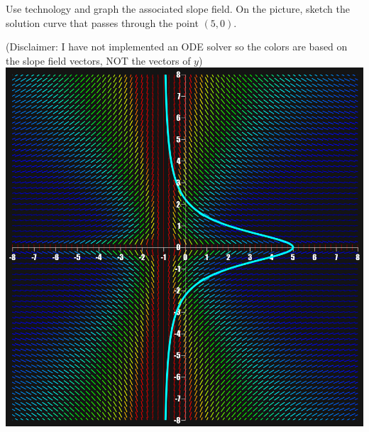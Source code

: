 Use technology and graph the associated slope field. On the picture, sketch the solution curve that passes through the point $(5,0)$.

\noindent (Disclaimer: I have not implemented an ODE solver so the colors are based on the slope field vectors, NOT the vectors of $y$)
\includegraphics[width=6in]{graph2b.png}
